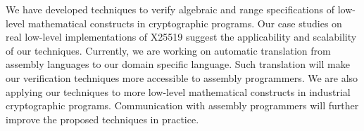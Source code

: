 
We have developed techniques to verify algebraic and range specifications of
low-level mathematical constructs in cryptographic programs. Our case
studies on real low-level implementations of X25519 suggest the
applicability and scalability of our techniques.
Currently, we are working on automatic translation from assembly languages to our domain specific language. Such translation will make our verification techniques more accessible to assembly programmers.
We are also applying our techniques to more low-level mathematical constructs in industrial
cryptographic programs. Communication with assembly programmers will further improve the proposed techniques in practice.
